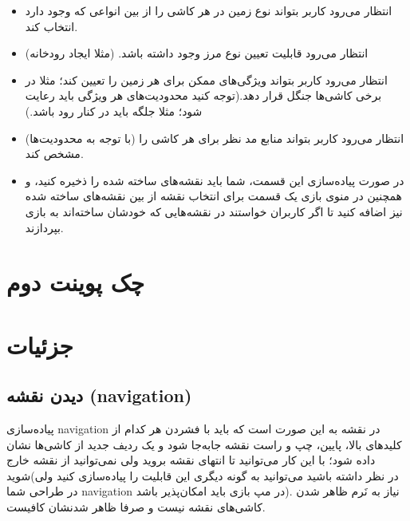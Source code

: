 \documentclass[]{article}
\begin{document}
\begin{itemize}
\item انتظار می‌رود کاربر بتواند نوع زمین در هر کاشی را از بین انواعی که وجود دارد انتخاب کند.

\item انتظار می‌رود قابلیت تعیین نوع مرز وجود داشته باشد. (مثلا ایجاد رودخانه)

\item انتظار می‌رود کاربر بتواند ویژگی‌های ممکن برای هر زمین را تعیین کند؛ مثلا در برخی کاشی‌ها جنگل قرار دهد.(توجه کنید محدودیت‌های هر ویژگی باید رعایت شود؛ مثلا جلگه باید در کنار رود باشد.) 

\item انتظار می‌رود کاربر بتواند منابع مد نظر برای هر کاشی را (با توجه به محدودیت‌ها) مشخص کند.

\item در صورت پیاده‌سازی این قسمت، شما باید نقشه‌های ساخته شده را ذخیره کنید، و همچنین در منوی بازی یک قسمت برای انتخاب نقشه از بین نقشه‌های ساخته شده نیز اضافه کنید تا اگر کاربران خواستند در نقشه‌هایی که خودشان ساخته‌اند به بازی بپردازند.

\end{itemize}









\section*{{\titr چک پوینت دوم}}


\section*{{\titr جزئیات}}


\subsection*{{\titr دیدن نقشه (navigation)}}

پیاده‌سازی navigation در نقشه به این صورت است که باید با فشردن هر کدام از کلیدهای بالا، پایین، چپ و راست نقشه جابه‌جا شود و یک ردیف جدید از کاشی‌ها نشان داده شود؛ با این کار می‌توانید تا انتهای نقشه بروید ولی نمی‌توانید از نقشه خارج شوید(در نظر داشته باشید می‌توانید به گونه دیگری این قابلیت را پیاده‌سازی کنید ولی در طراحی شما navigation در مپ بازی باید امکان‌پذیر باشد).
نیاز به نَرم ظاهر شدن کاشی‌های نقشه نیست و صرفا ظاهر شدنشان کافیست.
\end{document}
